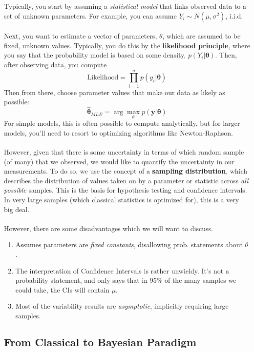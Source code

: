 \documentclass[12pt]{article}
\begin{document}
Typically, you start by assuming a \emph{statistical model} that links
observed data to a set of unknown parameters.  For example, you
can assume $Y_i \sim N(\mu,\sigma^2)$, i.i.d.
\\
\\
Next, you want to estimate a vector of parameters, $\mathbb{\theta}$,
which are assumed to be fixed, unknown values. Typically, you do this
by the \textbf{likelihood principle}, where you say that the probability
model is based on some density, $p(Y_i | \mathbf{\theta})$. Then, after
observing data, you compute
   \[ \text{Likelihood} = \prod^n_{i=1} p(y_i | \mathbf{\theta}) \]
Then from there, choose parameter values that make our data as 
likely as possible:
   \[ \hat{\mathbf{\theta}}_{MLE} = \arg \max_{\mathbb{\theta}} 
      p( \mathbf{y} | \mathbf{\theta}) \]
For simple models, this is often possible to compute analytically, but
for larger models, you'll need to resort to optimizing algorithms
like Newton-Raphson.
\\
\\
However, given that there is some uncertainty in terms of which
random sample (of many) that we observed, we would like to quantify
the uncertainty in our measurements.  To do so, we use the concept
of a \textbf{sampling distribution}, which describes the distribution
of values taken on by a parameter or statistic across \emph{all
possible} samples.  This is the basis for hypothesis testing and
confidence intervals.  In very large samples (which classical 
statistics is optimized for), this is a very big deal.
\\
\\
However, there are some disadvantages which we will want to discuss.
\begin{enumerate}
   \item{Assumes parameters are \emph{fixed constants}, 
      disallowing prob. statements about $\theta$.}
   \item{The interpretation of Confidence Intervals is rather unwieldy.
      It's not a probability statement, and only says that in 95\%
      of the many samples we could take, the CIs will contain $\mu$.}
   \item{Most of the variability results are \emph{asymptotic}, 
      implicitly requiring large samples.}
\end{enumerate}
   
\subsection{From Classical to Bayesian Paradigm}
\end{document}
